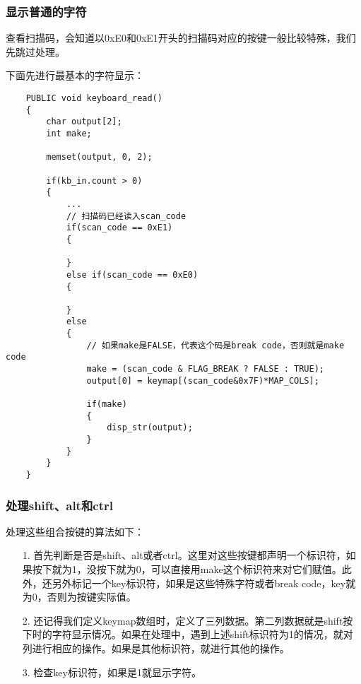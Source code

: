 \documentclass[a4paper,left=2.5cm,right=2.5cm,11pt]{article}
\begin{document}
\subsubsection{显示普通的字符}
	查看扫描码，会知道以0xE0和0xE1开头的扫描码对应的按键一般比较特殊，我们先跳过处理。\par

	下面先进行最基本的字符显示：
	\begin{lstlisting}
	PUBLIC void keyboard_read()
	{
		char output[2];
		int make;

		memset(output, 0, 2);

		if(kb_in.count > 0)
		{
			...
			// 扫描码已经读入scan_code
			if(scan_code == 0xE1)
			{

			}
			else if(scan_code == 0xE0)
			{

			}
			else
			{
				// 如果make是FALSE，代表这个码是break code，否则就是make code
				make = (scan_code & FLAG_BREAK ? FALSE : TRUE);
				output[0] = keymap[(scan_code&0x7F)*MAP_COLS];

				if(make)
				{
					disp_str(output);
				}
			}
		}
	}
	\end{lstlisting}

\subsubsection{处理shift、alt和ctrl}
	处理这些组合按键的算法如下：
	\begin{itemize}
		\item[1.] 首先判断是否是shift、alt或者ctrl。这里对这些按键都声明一个标识符，如果按下就为1，没按下就为0，可以直接用make这个标识符来对它们赋值。此外，还另外标记一个key标识符，如果是这些特殊字符或者break code，key就为0，否则为按键实际值。
		\item[2.] 还记得我们定义keymap数组时，定义了三列数据。第二列数据就是shift按下时的字符显示情况。如果在处理中，遇到上述shift标识符为1的情况，就对列进行相应的操作。如果是其他标识符，就进行其他的操作。
		\item[3.] 检查key标识符，如果是1就显示字符。
	\end{itemize}
\end{document}
